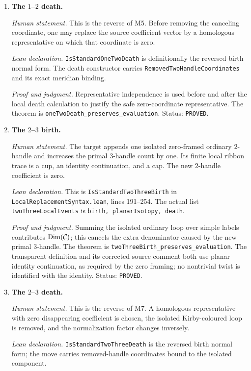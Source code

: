 \begin{enumerate}[label=\textbf{M\arabic*.},leftmargin=*]
\item \textbf{The $1$--$2$ death.}

\emph{Human statement.}
This is the reverse of M5.  Before removing the canceling coordinate, one may
replace the source coefficient vector by a homologous representative on which
that coordinate is zero.

\emph{Lean declaration.}
\texttt{IsStandardOneTwoDeath} is definitionally the reversed birth normal
form.  The death constructor carries
\texttt{RemovedTwoHandleCoordinates} and its exact meridian binding.

\emph{Proof and judgment.}
Representative independence is used before and after the local death
calculation to justify the safe zero-coordinate representative.  The theorem
is \nolinkurl{oneTwoDeath_preserves_evaluation}.  Status: \texttt{PROVED}.

\item \textbf{The $2$--$3$ birth.}

\emph{Human statement.}
The target appends one isolated zero-framed ordinary $2$-handle and increases
the primal $3$-handle count by one.  Its finite local ribbon trace is a cup,
an identity continuation, and a cap.  The new $2$-handle coefficient is zero.

\emph{Lean declaration.}
This is \texttt{IsStandardTwoThreeBirth} in
\nolinkurl{LocalReplacementSyntax.lean}, lines 191--254.  The actual list
\texttt{twoThreeLocalEvents} is
\texttt{birth, planarIsotopy, death}.

\emph{Proof and judgment.}
Summing the isolated ordinary loop over simple labels contributes
$\operatorname{Dim}(\mathcal{C})$; this cancels the extra denominator caused by the
new primal $3$-handle.  The theorem is
\nolinkurl{twoThreeBirth_preserves_evaluation}.  The transparent definition
and its corrected source comment both use planar identity continuation, as
required by the zero framing; no nontrivial twist is identified with the
identity.  Status: \texttt{PROVED}.

\item \textbf{The $2$--$3$ death.}

\emph{Human statement.}
This is the reverse of M7.  A homologous representative with zero disappearing
coefficient is chosen, the isolated Kirby-coloured loop is removed, and the
normalization factor changes inversely.

\emph{Lean declaration.}
\texttt{IsStandardTwoThreeDeath} is the reversed birth normal form; the move
carries removed-handle coordinates bound to the isolated component.


\end{enumerate}

